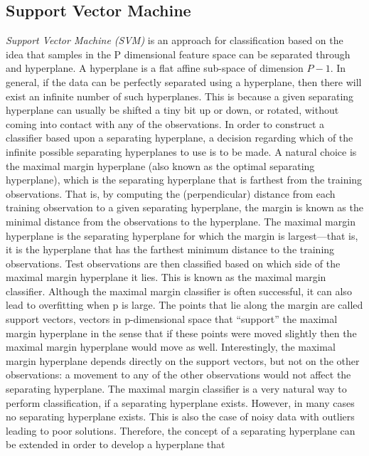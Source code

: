 \subsection{Support Vector Machine}

\textit{Support Vector Machine (SVM)} is an approach for classification based on the idea that samples in the P dimensional feature space can be
separated through and hyperplane. A hyperplane is a flat affine sub-space of dimension $P-1$.
In general, if the data can be perfectly separated using a hyperplane, then there will exist an 
infinite number of such hyperplanes. This is because a given separating hyperplane can usually be 
shifted a tiny bit up or down, or rotated, without coming into contact with any of the observations. In 
order to construct a classifier based upon a separating hyperplane, a decision regarding which of the infinite possible separating 
hyperplanes to use is to be made. 
A natural choice is the maximal margin hyperplane (also known as the optimal separating 
hyperplane), which is the separating hyperplane that is farthest from the training observations. That 
is, by computing the (perpendicular) distance from each training observation to a given separating 
hyperplane, the margin is known as the minimal distance from the observations to the hyperplane.
The maximal margin hyperplane is the separating hyperplane for which the margin is largest—that is, 
it is the hyperplane that has the farthest minimum distance 
to the training observations. 
Test observations are then classified based on which side of the 
maximal margin hyperplane it lies. This is known as the maximal margin classifier.
Although the maximal margin classifier is often successful, it can also lead to overfitting when p is 
large.
The points that lie along the margin are called support vectors, vectors in p-dimensional space that
“support” the maximal margin hyperplane in the sense that if these points were moved slightly then 
the maximal margin hyperplane would move as well. Interestingly, the maximal margin hyperplane depends directly on the 
support vectors, but not on the other observations: a movement to any of the 
other observations would not affect the separating hyperplane.
The maximal margin classifier is a very natural way to perform classification, if a separating 
hyperplane exists. However, in many cases no separating hyperplane exists. This 
is also the case of noisy data with outliers leading to poor solutions.
Therefore, the concept of a separating hyperplane can be extended in order to develop a hyperplane that 
